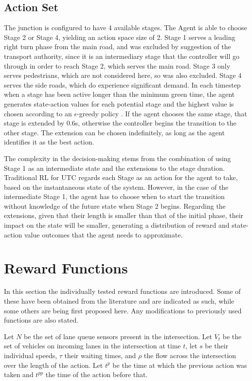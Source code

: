 \documentclass[conference]{IEEEtran}
\begin{document}
\subsection{Action Set}
The junction is configured to have 4 available stages. The Agent is able to choose Stage 2 or Stage 4, yielding an action space size of 2.
Stage 1 serves a leading right turn phase from the main road, and was excluded by suggestion of the transport authority, since it is an intermediary stage that the controller will go through in order to reach Stage 2, which serves the main road.
Stage 3 only serves pedestrians, which are not considered here, so was also excluded.
Stage 4 serves the side roads, which do experience significant demand.
In each timestep when a stage has been active longer than the minimum green time, the agent generates state-action values for each potential stage and the highest value is chosen according to an $\epsilon$-greedy policy \cite{suttonbarto}. If the agent chooses the same stage, that stage is extended by 0.6s, otherwise the controller begins the transition to the other stage.
The extension can be chosen indefinitely, as long as the agent identifies it as the best action.

The complexity in the decision-making stems from the combination of using Stage 1 as an intermediate state and the extensions to the stage duration.
Traditional RL for UTC regards each Stage as an action for the agent to take, based on the instantaneous state of the system.
However, in the case of the intermediate Stage 1, the agent has to choose when to start the transition without knowledge of the future state when Stage 2 begins.
Regarding the extensions, given that their length is smaller than that of the initial phase, their impact on the state will be smaller, generating a distribution of reward and state-action value outcomes that the agent needs to approximate.

\section{Reward Functions} \label{rewards}
In this section the individually tested reward functions are introduced.
Some of these have been obtained from the literature and are indicated as such, while some others are being first proposed here.
Any modifications to previously used functions are also stated.

Let $N$ be the set of lane queue sensors present in the intersection.
Let $V_t$ be the set of vehicles on incoming lanes in the intersection at time $t$, let $s$ be their individual speeds, $\tau$ their waiting times, and $\rho$ the flow across the intersection over the length of the action.
Let $t^p$ be the time at which the previous action was taken and $t^{pp}$ the time of the action before that.
\end{document}
